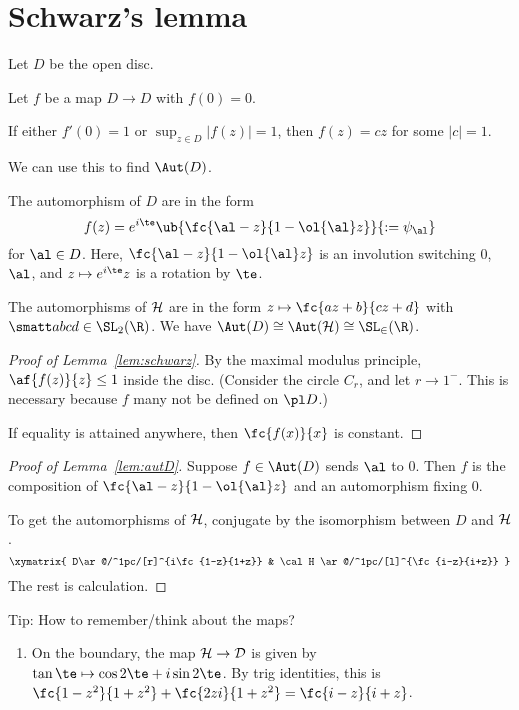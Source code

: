 \section{Schwarz's lemma}
Let $D$ be the open disc.
\begin{lem}[Schwarz]
Let $f$ be a map $D\to D$ with $f(0)=0$.

If either $f'(0)=1$ or $\sup_{z\in D} |f(z)|=1$, then $f(z)=cz$ for some $|c|=1$.
\end{lem}
We can use this to find $\Aut(D)$.
\begin{lem}
The automorphism of $D$ are in the form
\[
f(z)=e^{i\te} \ub{\fc{\al - z}{1-\ol{\al}z}}{:=\psi_\al}
\]
for $\al\in D$. Here, $ \fc{\al - z}{1-\ol{\al}z}$ is an involution switching 0, $\al$, and $z\mapsto e^{i\te}z$ is a rotation by $\te$.

The automorphisms of $\cal H$ are in the form $z\mapsto \fc{az+b}{cz+d}$ with $\smatt abcd\in \SL_2(\R)$. We have $\Aut(D)\cong \Aut(\cal H)\cong \SL_2(\R)$.
\end{lem}
\begin{proof}[Proof of Lemma~\ref{lem:schwarz}]
By the maximal modulus principle, $\af{f(z)}{z}\le 1$ inside the disc. (Consider the circle $C_r$, and let $r\to 1^-$. This is necessary because $f$ many not be defined on $\pl D$.)

If equality is attained anywhere, then $\fc{f(x)}{x}$ is constant. 
\end{proof}

\begin{proof}[Proof of Lemma~\ref{lem:autD}]
Suppose $f\in \Aut(D)$ sends $\al$ to 0.
Then $f$ is the composition of $\fc{\al-z}{1-\ol{\al}z}$ and an automorphism fixing 0.

To get the automorphisms of $\cal H$, conjugate by the isomorphism between $D$ and $\cal H$.
\[
\xymatrix{
D\ar@/^1pc/[r]^{i\fc{1-z}{1+z}} & \cal H \ar@/^1pc/[l]^{\fc{i-z}{i+z}}
}
\]
The rest is calculation.
\end{proof}

Tip: How to remember/think about the maps? 
\begin{enumerate}
\item
On the boundary, the map $\cal H\to D$ is given by $\tan \te\mapsto \cos 2\te+i\sin 2\te$. By trig identities, this is $\fc{1-z^2}{1+z^2}+\fc{2zi}{1+z^2}=\fc{i-z}{i+z}$. 
\end{enumerate}
